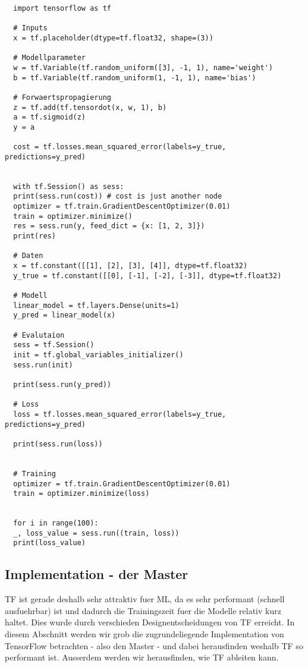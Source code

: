 \begin{verbatim}
  import tensorflow as tf

  # Inputs
  x = tf.placeholder(dtype=tf.float32, shape=(3))

  # Modellparameter
  w = tf.Variable(tf.random_uniform([3], -1, 1), name='weight')
  b = tf.Variable(tf.random_uniform(1, -1, 1), name='bias')

  # Forwaertspropagierung
  z = tf.add(tf.tensordot(x, w, 1), b)
  a = tf.sigmoid(z)
  y = a

  cost = tf.losses.mean_squared_error(labels=y_true, predictions=y_pred)


  with tf.Session() as sess:
  print(sess.run(cost)) # cost is just another node
  optimizer = tf.train.GradientDescentOptimizer(0.01)
  train = optimizer.minimize()
  res = sess.run(y, feed_dict = {x: [1, 2, 3]})
  print(res)

  # Daten
  x = tf.constant([[1], [2], [3], [4]], dtype=tf.float32)
  y_true = tf.constant([[0], [-1], [-2], [-3]], dtype=tf.float32)

  # Modell
  linear_model = tf.layers.Dense(units=1)
  y_pred = linear_model(x)

  # Evalutaion
  sess = tf.Session()
  init = tf.global_variables_initializer()
  sess.run(init)

  print(sess.run(y_pred))

  # Loss
  loss = tf.losses.mean_squared_error(labels=y_true, predictions=y_pred)

  print(sess.run(loss))


  # Training
  optimizer = tf.train.GradientDescentOptimizer(0.01)
  train = optimizer.minimize(loss)


  for i in range(100):
  _, loss_value = sess.run((train, loss))
  print(loss_value)

\end{verbatim}


\subsection{Implementation - der Master}
TF ist gerade deshalb sehr attraktiv fuer ML, da es sehr performant (schnell
ausfuehrbar) ist und dadurch die Trainingszeit fuer die Modelle relativ
kurz haltet. Dies wurde durch verschieden Designentscheidungen von TF erreicht.
\para{}
In diesem Abschnitt werden wir grob die zugrundeliegende Implementation von
TensorFlow betrachten - also den Master - und dabei herausfinden weshalb TF so performant ist.
Ausserdem werden wir herausfinden, wie TF ableiten kann.


